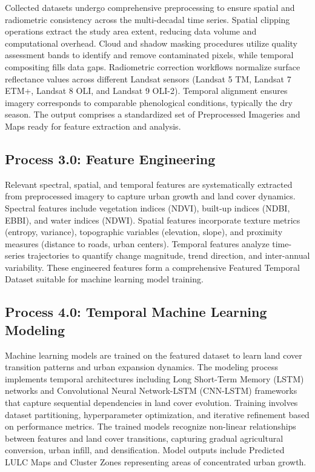 \documentclass[main]{subfiles}
\begin{document}
Collected datasets undergo comprehensive preprocessing to ensure spatial and radiometric consistency across the multi-decadal time series. Spatial clipping operations extract the study area extent, reducing data volume and computational overhead. Cloud and shadow masking procedures utilize quality assessment bands to identify and remove contaminated pixels, while temporal compositing fills data gaps. Radiometric correction workflows normalize surface reflectance values across different Landsat sensors (Landsat 5 TM, Landsat 7 ETM+, Landsat 8 OLI, and Landsat 9 OLI-2). Temporal alignment ensures imagery corresponds to comparable phenological conditions, typically the dry season. The output comprises a standardized set of Preprocessed Imageries and Maps ready for feature extraction and analysis.

\subsection*{Process 3.0: Feature Engineering}

Relevant spectral, spatial, and temporal features are systematically extracted from preprocessed imagery to capture urban growth and land cover dynamics. Spectral features include vegetation indices (NDVI), built-up indices (NDBI, EBBI), and water indices (NDWI). Spatial features incorporate texture metrics (entropy, variance), topographic variables (elevation, slope), and proximity measures (distance to roads, urban centers). Temporal features analyze time-series trajectories to quantify change magnitude, trend direction, and inter-annual variability. These engineered features form a comprehensive Featured Temporal Dataset suitable for machine learning model training.


\subsection*{Process 4.0: Temporal Machine Learning Modeling}

Machine learning models are trained on the featured dataset to learn land cover transition patterns and urban expansion dynamics. The modeling process implements temporal architectures including Long Short-Term Memory (LSTM) networks and Convolutional Neural Network-LSTM (CNN-LSTM) frameworks that capture sequential dependencies in land cover evolution. Training involves dataset partitioning, hyperparameter optimization, and iterative refinement based on performance metrics. The trained models recognize non-linear relationships between features and land cover transitions, capturing gradual agricultural conversion, urban infill, and densification. Model outputs include Predicted LULC Maps and Cluster Zones representing areas of concentrated urban growth.
\end{document}
